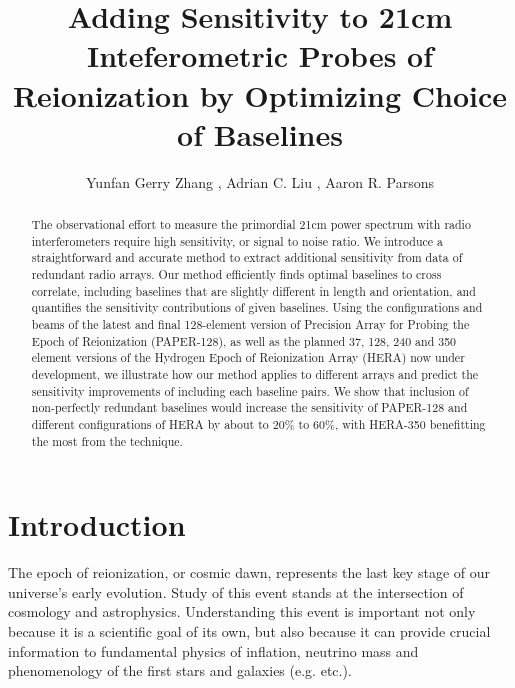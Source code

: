 \documentclass[twocolumn,apj,numberedappendix]{emulateapj}
\renewcommand\[{\begin{equation}}
\renewcommand\]{\end{equation}}
\begin{document}
\title{Adding Sensitivity to 21cm Inteferometric Probes of Reionization by Optimizing Choice of Baselines}

\author{
Yunfan Gerry Zhang ,
Adrian C. Liu ,
Aaron R. Parsons
}


\begin{abstract}
The observational effort to measure the primordial 21cm power spectrum with radio interferometers require high sensitivity, or signal to noise ratio. We introduce a straightforward and accurate method to extract additional sensitivity from data of redundant radio arrays. Our method efficiently finds optimal baselines to cross correlate, including baselines that are slightly different in length and orientation, and quantifies the sensitivity contributions of given baselines. 
Using the configurations and beams of the latest and final 128-element version of Precision Array for Probing the Epoch of Reionization (PAPER-128), as well as the planned 37, 128, 240 and 350 element versions of the Hydrogen Epoch of Reionization Array (HERA) now under development, we illustrate how our method applies to different arrays and predict the sensitivity improvements of including each baseline pairs. We show that inclusion of non-perfectly redundant baselines 
would increase the sensitivity of PAPER-128 and different configurations of HERA by about to $20\%$ to $60\%$, with HERA-350 benefitting the most from the technique. 
\end{abstract}

\section{Introduction}

The epoch of reionization, or cosmic dawn, represents the last key
stage of our universe's early evolution. Study of this event stands at
the intersection of cosmology and astrophysics. Understanding this
event is important not only because it is a scientific goal
of its own, but also because it can provide crucial information
to fundamental physics of inflation, neutrino mass and phenomenology
of the first stars and galaxies (e.g. \citealt{LiuOpticalDepth, Liu2016b, Mao2008, DEw21cm, Bull2015, Oyama20131186} etc.). 
\end{document}
